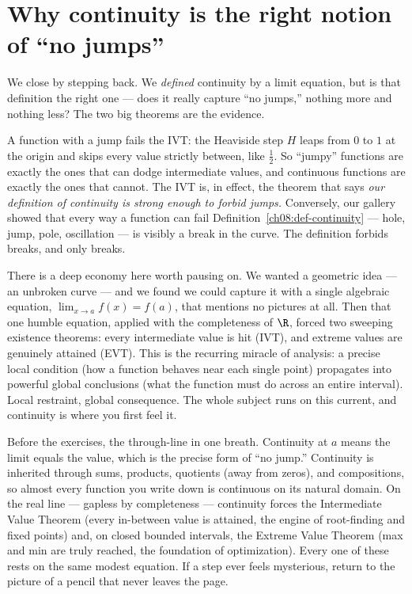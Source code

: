 \section{Why continuity is the right notion of ``no jumps''}
\label{ch08:right-notion}

We close by stepping back. We \emph{defined} continuity by a limit equation, but is that
definition the right one --- does it really capture ``no jumps,'' nothing more and nothing
less? The two big theorems are the evidence.

A function with a jump fails the IVT: the Heaviside step $H$ leaps from $0$ to $1$ at the
origin and skips every value strictly between, like $\tfrac12$. So ``jumpy'' functions are
exactly the ones that can dodge intermediate values, and continuous functions are exactly
the ones that cannot. The IVT is, in effect, the theorem that says \emph{our definition of
continuity is strong enough to forbid jumps.} Conversely, our gallery showed that every way
a function can fail Definition~\ref{ch08:def-continuity} --- hole, jump, pole, oscillation
--- is visibly a break in the curve. The definition forbids breaks, and only breaks.

\begin{aestheticbox}
There is a deep economy here worth pausing on. We wanted a geometric idea --- an unbroken
curve --- and we found we could capture it with a single algebraic equation,
$\lim_{x\to a}f(x)=f(a)$, that mentions no pictures at all. Then that one humble equation,
applied with the completeness of $\R$, forced two sweeping existence theorems: every
intermediate value is hit (IVT), and extreme values are genuinely attained (EVT). This is
the recurring miracle of analysis: a precise local condition (how a function behaves near
each single point) propagates into powerful global conclusions (what the function must do
across an entire interval). Local restraint, global consequence. The whole subject runs on
this current, and continuity is where you first feel it.
\end{aestheticbox}

\begin{recoverybox}
Before the exercises, the through-line in one breath. Continuity at $a$ means the limit
equals the value, which is the precise form of ``no jump.'' Continuity is inherited through
sums, products, quotients (away from zeros), and compositions, so almost every function you
write down is continuous on its natural domain. On the real line --- gapless by completeness
--- continuity forces the Intermediate Value Theorem (every in-between value is attained,
the engine of root-finding and fixed points) and, on closed bounded intervals, the Extreme
Value Theorem (max and min are truly reached, the foundation of optimization). Every one of
these rests on the same modest equation. If a step ever feels mysterious, return to the
picture of a pencil that never leaves the page.
\end{recoverybox}

